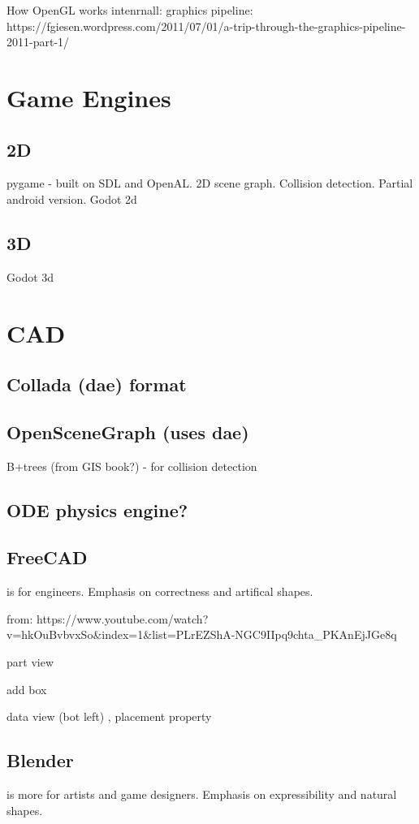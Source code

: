 \documentclass[oneside,english]{scrbook}
\begin{document}
How OpenGL works intenrnall: graphics pipeline: https://fgiesen.wordpress.com/2011/07/01/a-trip-through-the-graphics-pipeline-2011-part-1/






\chapter{Game Engines}
\section{2D}
pygame - built on SDL and OpenAL.  2D scene graph. Collision detection. Partial android version.
Godot 2d

\section{3D}
Godot 3d

\chapter{CAD}
\section{Collada (dae) format}


\section{OpenSceneGraph (uses dae)}
B+trees (from GIS book?) - for collision detection

\section{ODE physics engine?}

\section{FreeCAD}
is for engineers. Emphasis on correctness and artifical shapes.

from:
https://www.youtube.com/watch?v=hkOuBvbvxSo&index=1&list=PLrEZShA-NGC9IIpq9chta_PKAnEjJGe8q

part view

add box

data view (bot left) , placement property


\section{Blender}
is more for artists and game designers. Emphasis on expressibility and natural shapes.
\end{document}
